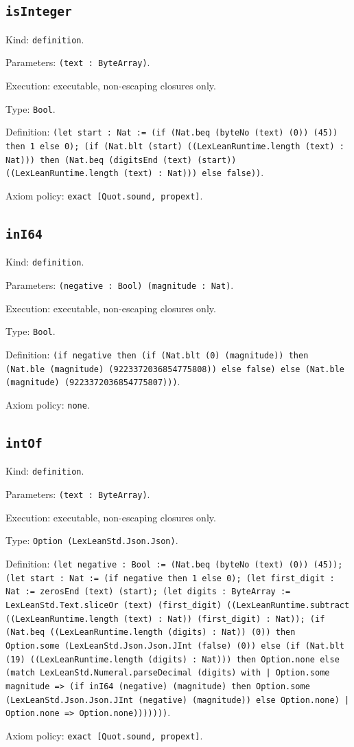 \documentclass[11pt]{article}
\begin{document}
\subsection*{\texttt{isInteger}}
\noindent Kind: \texttt{definition}.\par
\noindent Parameters: \texttt{(text : ByteArray)}.\par
\noindent Execution: executable, non-escaping closures only.\par
\noindent Type: \texttt{Bool}.\par
\noindent Definition: \texttt{(let start : Nat := (if (Nat.beq (byteNo (text) (0)) (45)) then 1 else 0); (if (Nat.blt (start) ((LexLeanRuntime.length (text) : Nat))) then (Nat.beq (digitsEnd (text) (start)) ((LexLeanRuntime.length (text) : Nat))) else false))}.\par
\noindent Axiom policy: \texttt{exact [Quot.sound, propext]}.\par
\subsection*{\texttt{inI64}}
\noindent Kind: \texttt{definition}.\par
\noindent Parameters: \texttt{(negative : Bool) (magnitude : Nat)}.\par
\noindent Execution: executable, non-escaping closures only.\par
\noindent Type: \texttt{Bool}.\par
\noindent Definition: \texttt{(if negative then (if (Nat.blt (0) (magnitude)) then (Nat.ble (magnitude) (9223372036854775808)) else false) else (Nat.ble (magnitude) (9223372036854775807)))}.\par
\noindent Axiom policy: \texttt{none}.\par
\subsection*{\texttt{intOf}}
\noindent Kind: \texttt{definition}.\par
\noindent Parameters: \texttt{(text : ByteArray)}.\par
\noindent Execution: executable, non-escaping closures only.\par
\noindent Type: \texttt{Option (LexLeanStd.Json.Json)}.\par
\noindent Definition: \texttt{(let negative : Bool := (Nat.beq (byteNo (text) (0)) (45)); (let start : Nat := (if negative then 1 else 0); (let first\_digit : Nat := zerosEnd (text) (start); (let digits : ByteArray := LexLeanStd.Text.sliceOr (text) (first\_digit) ((LexLeanRuntime.subtract ((LexLeanRuntime.length (text) : Nat)) (first\_digit) : Nat)); (if (Nat.beq ((LexLeanRuntime.length (digits) : Nat)) (0)) then Option.some (LexLeanStd.Json.Json.JInt (false) (0)) else (if (Nat.blt (19) ((LexLeanRuntime.length (digits) : Nat))) then Option.none else (match LexLeanStd.Numeral.parseDecimal (digits) with | Option.some magnitude => (if inI64 (negative) (magnitude) then Option.some (LexLeanStd.Json.Json.JInt (negative) (magnitude)) else Option.none) | Option.none => Option.none)))))))}.\par
\noindent Axiom policy: \texttt{exact [Quot.sound, propext]}.\par
\end{document}

